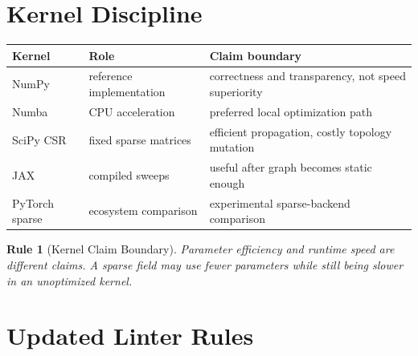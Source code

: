 \documentclass[12pt]{article}
\newtheorem{rulebox}{Rule}
\begin{document}
\section{Kernel Discipline}

\begin{longtable}{p{}p{}p{}}
\toprule
\textbf{Kernel} & \textbf{Role} & \textbf{Claim boundary} \\
\midrule
NumPy & reference implementation & correctness and transparency, not speed superiority \\
Numba & CPU acceleration & preferred local optimization path \\
SciPy CSR & fixed sparse matrices & efficient propagation, costly topology mutation \\
JAX & compiled sweeps & useful after graph becomes static enough \\
PyTorch sparse & ecosystem comparison & experimental sparse-backend comparison \\
\bottomrule
\end{longtable}

\begin{rulebox}[Kernel Claim Boundary]
Parameter efficiency and runtime speed are different claims. A sparse field may
use fewer parameters while still being slower in an unoptimized kernel.
\end{rulebox}

\section{Updated Linter Rules}
\end{document}
